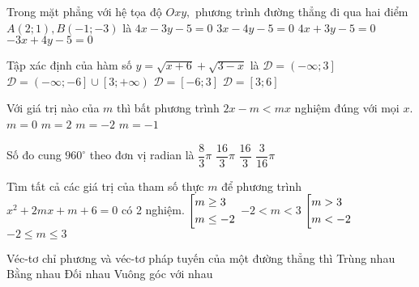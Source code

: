 \begin{ex}%
	Trong mặt phẳng với hệ tọa độ $Oxy,$ phương trình đường thẳng đi qua hai điểm $A(2;1),B(-1;-3)$ là
	\choice
	{\True $4x-3y-5=0$}
	{$3x-4y-5=0$}
	{$4x+3y-5=0$}
	{$-3x+4y-5=0$}
\end{ex}
\begin{ex}%
	Tập xác định của hàm số $y=\sqrt{x+6}+\sqrt{3-x}$ là
	\choice
	{$\mathscr{D}=\left(-\infty;3\right]$}
	{$\mathscr{D}=\left(-\infty;-6\right]\cup \left[3;+\infty \right)$}
	{\True $\mathscr{D}=\left[-6;3\right]$}
	{$\mathscr{D}=\left[3;6\right]$}
\end{ex}
\begin{ex}%
	Với giá trị nào của $m$ thì bất phương trình $2x-m<mx$ nghiệm đúng với mọi $x.$ 
	\choice
	{\True $m=0$}
	{$m=2$}
	{$m=-2$}
	{$m=-1$}
\end{ex}
\begin{ex}%
	Số đo cung ${960}^{\circ}$ theo đơn vị radian là
	\choice
	{$\dfrac{8}{3}\pi $}
	{\True $\dfrac{16}{3}\pi $}
	{$\dfrac{16}{3}$}
	{$\dfrac{3}{16}\pi $}
\end{ex}
\begin{ex}%
	Tìm tất cả các giá trị của tham số thực $m$ để phương trình $x^2+2mx+m+6=0$ có 2 nghiệm.
	\choice
	{\True $\left[\begin{aligned}
		& m\ge 3 \\
		& m\le-2\end{aligned}\right.$}
	{$-2<m<3$}
	{$\left[\begin{aligned}
		& m>3 \\
		& m<-2\end{aligned}\right.$}
	{$-2\le m\le 3$}
\end{ex}
\begin{ex}%
	Véc-tơ chỉ phương và véc-tơ pháp tuyến của một đường thẳng thì
	\choice
	{Trùng nhau}
	{Bằng nhau}
	{Đối nhau}
	{\True Vuông góc với nhau}
\end{ex}

